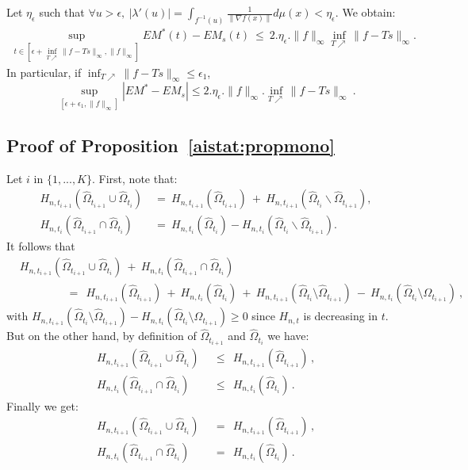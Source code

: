 \noindent Let $\eta_\epsilon$ such that $ \forall u > \epsilon,~|\lambda'(u)|= \int_{f^{-1}(u)} \frac{1}{\|\nabla f(x)\|} d\mu(x)<\eta_\epsilon$.
 We obtain:
\begin{align*}
\sup_{t \in [\epsilon + \inf_{T \nearrow}\|f-Ts\|_\infty,\|f\|_\infty]} EM^*(t)-EM_s(t)~\le~ 2.\eta_\epsilon.\|f\|_\infty \inf_{T \nearrow}\|f-Ts\|_\infty.
\end{align*}
\noindent In particular, if $\inf_{T \nearrow}\|f-Ts\|_\infty \le \epsilon_1 $, 
 $$\sup_{[\epsilon + \epsilon_1,\|f\|_\infty]}|EM^*-EM_s| \le 2.\eta_{\epsilon}.\|f\|_\infty. \inf_{T \nearrow}\|f-Ts\|_\infty~. $$
\noindent


\subsection*{Proof of Proposition~\ref{aistat:propmono}}


\noindent Let $i$ in $\{1,...,K\}$. First, note  that:
\begin{align*}
H_{n,t_{i+1}}(\hat \Omega_{t_{i+1}} \cup \hat \Omega_{t_{i}}) &~=~ H_{n,t_{i+1}}(\hat \Omega_{t_{i+1}}) ~+~ H_{n,t_{i+1}}(\hat \Omega_{t_{i}} \smallsetminus \hat \Omega_{t_{i+1}}),\\
H_{n,t_{i}}(\hat \Omega_{t_{i+1}} \cap \hat \Omega_{t_{i}}) &~=~ H_{n,t_{i}}(\hat \Omega_{t_{i}}) - H_{n,t_{i}}(\hat \Omega_{t_{i}} \smallsetminus \hat \Omega_{t_{i+1}}).
\end{align*}
It follows that
\begin{align*}
&H_{n,t_{i+1}}( \hat \Omega_{t_{i+1}} \cup \hat \Omega_{t_{i}}) ~+~ H_{n,t_{i}}(\hat \Omega_{t_{i+1}} \cap \hat \Omega_{t_{i}}) \\
&~~~~~~~~~~~~~~~~~~~=~~ H_{n,t_{i+1}}(\hat \Omega_{t_{i+1}}) ~+~ H_{n,t_{i}}(\hat \Omega_{t_{i}}) ~+~ H_{n,t_{i+1}}(\hat \Omega_{t_{i}} \setminus \hat \Omega_{t_{i+1}}) ~-~ H_{n,t_{i}}(\hat \Omega_{t_{i}} \setminus \hat \Omega_{t_{i+1}})~,
\end{align*}
with $H_{n,t_{i+1}}(\hat \Omega_{t_{i}} \setminus \hat \Omega_{t_{i+1}}) - H_{n,t_{i}}(\hat \Omega_{t_{i}} \setminus \hat \Omega_{t_{i+1}}) \ge 0$ since $H_{n,t}$ is decreasing in $t$. But on the other hand, by definition of $\hat \Omega_{t_{i+1}}$ and $\hat \Omega_{t_{i}}$ we have:
\begin{align*}
H_{n,t_{i+1}}(\hat \Omega_{t_{i+1}} \cup \hat \Omega_{t_{i}}) &~~\le~~ H_{n,t_{i+1}}(\hat \Omega_{t_{i+1}})\,,\\
H_{n,t_{i}}(\hat \Omega_{t_{i+1}} \cap \hat \Omega_{t_{i}}) &~~\le~~ H_{n,t_{i}}(\hat \Omega_{t_{i}})\,.
\end{align*}
\noindent
Finally we get:
\begin{align*}
H_{n,t_{i+1}}(\hat \Omega_{t_{i+1}} \cup \hat \Omega_{t_{i}}) &~~=~~ H_{n,t_{i+1}}(\hat \Omega_{t_{i+1}})\,,\\
H_{n,t_{i}}(\hat \Omega_{t_{i+1}} \cap \hat \Omega_{t_{i}}) &~~=~~ H_{n,t_{i}}(\hat \Omega_{t_{i}})\,.
\end{align*}

